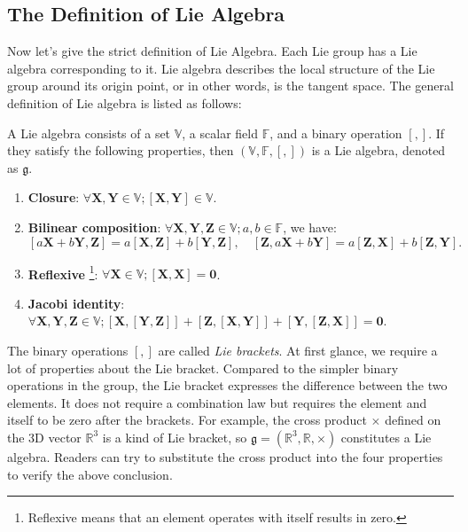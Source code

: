 \subsection{The Definition of Lie Algebra}
Now let's give the strict definition of Lie Algebra. Each Lie group has a Lie algebra corresponding to it. Lie algebra describes the local structure of the Lie group around its origin point, or in other words, is the tangent space. The general definition of Lie algebra is listed as follows:

A Lie algebra consists of a set $\mathbb{V}$, a scalar field $\mathbb{F}$, and a binary operation $[,]$. If they satisfy the following properties, then $(\mathbb{V}, \mathbb{F}, [,])$ is a Lie algebra, denoted as $\mathfrak{g}$.

\begin{enumerate}
    \item \textbf{Closure}: $\forall \mathbf{X}, \mathbf{Y} \in \mathbb{V}; [\mathbf{X}, \mathbf{Y}] \in \mathbb{V}$.
    \item \textbf{Bilinear composition}: $\forall \mathbf{X},\mathbf{Y},\mathbf{Z} \in \mathbb{V}; a,b \in \mathbb{F }$, we have:
    \[
    [a\mathbf{X}+b\mathbf{Y}, \mathbf{Z}] = a[\mathbf{X}, \mathbf{Z}] + b [ \mathbf{Y}, \mathbf{Z} ], \quad [\mathbf{Z}, a \mathbf{X}+b\mathbf{Y}] = a [\mathbf{Z}, \mathbf{X} ]+ b [\mathbf{Z},\mathbf{Y}] .
    \]
    \item \textbf{Reflexive} \footnote{ Reflexive means that an element operates with itself results in zero. }: $\forall \mathbf{X} \in \mathbb{V}; [\mathbf{X},\mathbf{X}] = \mathbf{0}$.
    \item \textbf{Jacobi identity}: $\forall \mathbf{X},\mathbf{Y},\mathbf{Z} \in \mathbb{V}; [\mathbf{X}, [ \mathbf{Y},\mathbf{Z}] ] + [\mathbf{Z}, [\mathbf{X},\mathbf{Y}] ] + [\mathbf{Y}, [\mathbf{Z}, \mathbf{X}]] =\mathbf{0}$.
\end{enumerate}
The binary operations $[,]$ are called \textit{Lie brackets}. At first glance, we require a lot of properties about the Lie bracket.  Compared to the simpler binary operations in the group, the Lie bracket expresses the difference between the two elements. It does not require a combination law but requires the element and itself to be zero after the brackets. For example, the cross product $\times$ defined on the 3D vector $\mathbb{R}^3$ is a kind of Lie bracket, so $\mathfrak{g} = (\mathbb{R}^3, \mathbb{R}, \times)$ constitutes a Lie algebra. Readers can try to substitute the cross product into the four properties to verify the above conclusion.


